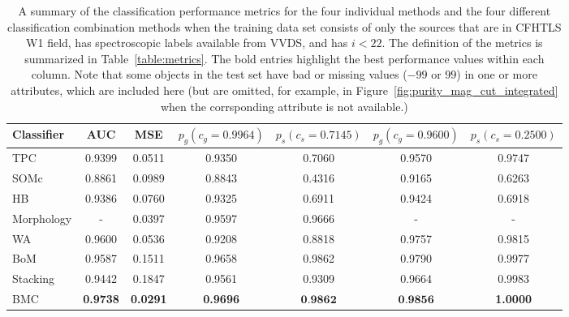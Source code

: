 \begin{table}
  \begin{tabular}{| l | c | c | c | c | c | c |}
  \hline
    Classifier & AUC & MSE &
    $p_{g}\left(c_g=0.9964\right)$ & $p_{s}\left(c_s=0.7145\right)$ &
    $p_{g}\left(c_g=0.9600\right)$ & $p_{s}\left(c_s=0.2500\right)$ \\
    \hline
    TPC        & 0.9399 & 0.0511 & 0.9350 & 0.7060 & 0.9570 & 0.9747 \\
    SOMc       & 0.8861 & 0.0989 & 0.8843 & 0.4316 & 0.9165 & 0.6263 \\
    HB         & 0.9386 & 0.0760 & 0.9325 & 0.6911 & 0.9424 & 0.6918 \\
    Morphology & - & 0.0397 & 0.9597 & 0.9666 & - & - \\
    WA         & 0.9600 & 0.0536 & 0.9208 & 0.8818 & 0.9757 & 0.9815 \\
    BoM        & 0.9587 & 0.1511 & 0.9658 & 0.9862 & 0.9790 & 0.9977 \\
    Stacking   & 0.9442 & 0.1847 & 0.9561 & 0.9309 & 0.9664 & 0.9983 \\
    BMC        & \textbf{0.9738} & \textbf{0.0291} & \textbf{0.9696} & $\textbf{0.9862}$ & $\textbf{0.9856}$ & \textbf{1.0000} \\
  \hline
  \end{tabular}
  \caption{A summary of the classification performance metrics
           for the four individual methods
           and the four different classification combination methods
           when the training data set consists of
           only the sources that are in CFHTLS W1 field,
           has spectroscopic labels available from VVDS,
           and has $i < 22$.
           The definition of the metrics is summarized in
           Table~\ref{table:metrics}.
           The bold entries highlight the best performance values
           within each column.
           Note that some objects in the test set have bad or missing
           values (\eg $-99$ or $99$) in one or more attributes,
           which are included here (but are omitted, for example,
           in Figure~\ref{fig:purity_mag_cut_integrated} when the corrsponding
           attribute is not available.)}
  \centering
  \label{table:metrics_cut}
\end{table}


\clearpage

